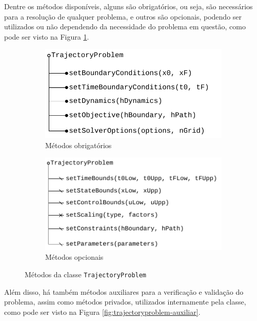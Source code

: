 Dentre os métodos disponíveis, alguns são obrigatórios, ou seja, são necessários para a resolução de qualquer problema, e outros são opcionais, podendo ser utilizados ou não dependendo da necessidade do problema em questão, como pode ser visto na Figura \ref{fig:trajectoryproblem-methods}.

\begin{figure}[H]
    \centering
    \begin{subfigure}{0.6\linewidth}
    \centering
        \includegraphics[width=\textwidth]{Cap3/figuras/TrajectoryProblem-mandatory.pdf}
        \caption{Métodos obrigatórios}
    \end{subfigure}
    \hfill
    \begin{subfigure}{0.7\linewidth}
    \centering
        \includegraphics[width=\textwidth]{Cap3/figuras/TrajectoryProblem-optional.pdf}
        \caption{Métodos opcionais}
    \end{subfigure}
    \caption{Métodos da classe \texttt{TrajectoryProblem}}
    \label{fig:trajectoryproblem-methods}
\end{figure}

Além disso, há também métodos auxiliares para a verificação e validação do problema, assim como métodos privados, utilizados internamente pela classe, como pode ser visto na Figura \ref{fig:trajectoryproblem-auxiliar}.

